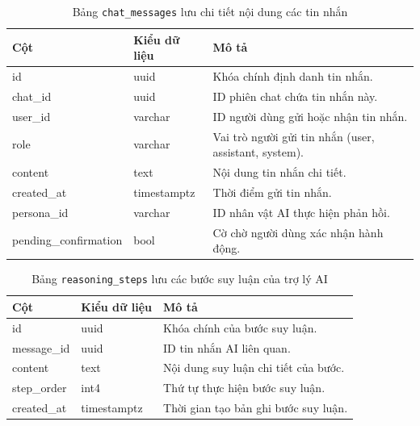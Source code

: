 \begin{table}[H]
\centering
\begin{tabular}{|l|l|p{6cm}|}
\hline
\textbf{Cột} & \textbf{Kiểu dữ liệu} & \textbf{Mô tả} \\ \hline
id & uuid & Khóa chính định danh tin nhắn. \\ \hline
chat\_id & uuid & ID phiên chat chứa tin nhắn này. \\ \hline
user\_id & varchar & ID người dùng gửi hoặc nhận tin nhắn. \\ \hline
role & varchar & Vai trò người gửi tin nhắn (user, assistant, system). \\ \hline
content & text & Nội dung tin nhắn chi tiết. \\ \hline
created\_at & timestamptz & Thời điểm gửi tin nhắn. \\ \hline
persona\_id & varchar & ID nhân vật AI thực hiện phản hồi. \\ \hline
pending\_confirmation & bool & Cờ chờ người dùng xác nhận hành động. \\ \hline
\end{tabular}
\caption{Bảng \texttt{chat\_messages} lưu chi tiết nội dung các tin nhắn}
\end{table}

\begin{table}[H]
\centering
\begin{tabular}{|l|l|p{6cm}|}
\hline
\textbf{Cột} & \textbf{Kiểu dữ liệu} & \textbf{Mô tả} \\ \hline
id & uuid & Khóa chính của bước suy luận. \\ \hline
message\_id & uuid & ID tin nhắn AI liên quan. \\ \hline
content & text & Nội dung suy luận chi tiết của bước. \\ \hline
step\_order & int4 & Thứ tự thực hiện bước suy luận. \\ \hline
created\_at & timestamptz & Thời gian tạo bản ghi bước suy luận. \\ \hline
\end{tabular}
\caption{Bảng \texttt{reasoning\_steps} lưu các bước suy luận của trợ lý AI}
\end{table}

